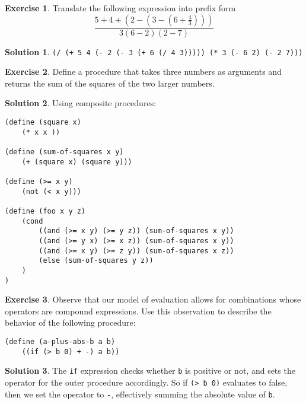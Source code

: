 \documentclass[11pt]{article}
\theoremstyle{definition}
\newcommand{\inline}{\texttt}
\newtheorem{exe}{Exercise}[section]
\newtheorem{sol}{Solution}[section]
\begin{document}
\begin{exe}
    Translate the following expression into prefix form
    \[
    \frac{5 + 4 + (2 - (3 - (6 + \frac{4}{3})))}{3(6 - 2)(2 - 7)}
    \]
\end{exe}
\begin{sol}
    \inline{(/ (+ 5 4 (- 2 (- 3 (+ 6 (/ 4 3))))) (* 3 (- 6 2) (- 2 7)))}
\end{sol}
\begin{exe}
    Define a procedure that takes three numbers as arguments and returns the sum of the squares of the two larger numbers.
\end{exe}
\begin{sol} Using composite procedures:
    \begin{verbatim}
(define (square x)
    (* x x ))

(define (sum-of-squares x y)
    (+ (square x) (square y)))

(define (>= x y)
    (not (< x y)))

(define (foo x y z)
    (cond
        ((and (>= x y) (>= y z)) (sum-of-squares x y))
        ((and (>= y x) (>= x z)) (sum-of-squares x y))
        ((and (>= x y) (>= z y)) (sum-of-squares x z))
        (else (sum-of-squares y z))
    )
)
    \end{verbatim}
\end{sol}
\begin{exe}
    Observe that our model of evaluation allows for combinations whose operators are compound expressions. Use this observation to describe the behavior of the following procedure:
    \begin{verbatim}
(define (a-plus-abs-b a b)
    ((if (> b 0) + -) a b))
    \end{verbatim}
\end{exe}
\begin{sol}
    The \inline{if} expression checks whether \inline{b} is positive or not, and sets the operator for the outer procedure accordingly. So if \inline{(> b 0)} evaluates to false, then we set the operator to \inline{-}, effectively summing the absolute value of \inline{b}.
\end{sol}
\end{document}
